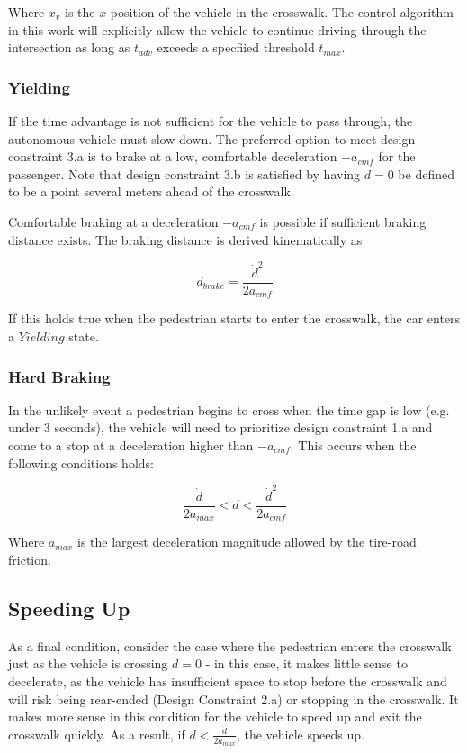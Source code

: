 \documentclass[letterpaper, 10 pt, conference]{ieeeconf}  %
\begin{document}
Where $x_v$ is the $x$ position of the vehicle in the crosswalk. The control algorithm in this work will explicitly allow the vehicle to continue driving through the intersection as long as $t_{adv}$ exceeds a specfiied threshold $t_{max}$. 

\subsubsection{Yielding}

If the time advantage is not sufficient for the vehicle to pass through, the autonomous vehicle must slow down. The preferred option to meet design constraint 3.a is to brake at a low, comfortable deceleration $-a_{cmf}$ for the passenger. Note that design constraint 3.b is satisfied by having $d=0$ be defined to be a point several meters ahead of the crosswalk. 

Comfortable braking at a deceleration $-a_{cmf}$ is possible if sufficient braking distance exists. The braking distance is derived kinematically as 

\begin{equation}
d_{brake} = \frac{\dot{d}^2}{2a_{cmf}}
\end{equation}

If this holds true when the pedestrian starts to enter the crosswalk, the car enters a $Yielding$ state. 

\subsubsection{Hard Braking}

In the unlikely event a pedestrian begins to cross when the time gap is low (e.g. under 3 seconds), the vehicle will need to prioritize design constraint 1.a and come to a stop at a deceleration higher than $-a_{cmf}$. This occurs when the following conditions holds:

\begin{equation}
\frac{\dot{d}}{2a_{max}} < d < \frac{\dot{d}^2}{2a_{cmf}}
\end{equation}

Where $a_{max}$ is the largest deceleration magnitude allowed by the tire-road friction. 

\subsection{Speeding Up}

As a final condition, consider the case where the pedestrian enters the crosswalk just as the vehicle is crossing $d = 0$ - in this case, it makes little sense to decelerate, as the vehicle has insufficient space to stop before the crosswalk and will risk being rear-ended (Design Constraint 2.a) or stopping in the crosswalk. It makes more sense in this condition for the vehicle to speed up and exit the crosswalk quickly. As a result, if $d < \frac{\dot{d}}{2a_{max}}$, the vehicle speeds up. 
\end{document}
